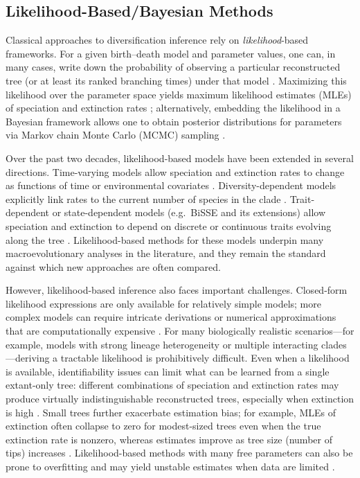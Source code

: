 \subsection{Likelihood-Based/Bayesian Methods}
Classical approaches to diversification inference rely on \emph{likelihood}-based frameworks. For a given birth--death model and parameter values, one can, in many cases, write down the probability of observing a particular reconstructed tree (or at least its ranked branching times) under that model \citep{nee_extinction_1994,nee_reconstructed_1994,stadler_simulating_2011,stadler_decoding_2024}. Maximizing this likelihood over the parameter space yields maximum likelihood estimates (MLEs) of speciation and extinction rates \citep{morlon_phylogenetic_2014,etienne_how_2016}; alternatively, embedding the likelihood in a Bayesian framework allows one to obtain posterior distributions for parameters via Markov chain Monte Carlo (MCMC) sampling \citep{xie_identifying_2023}. 

Over the past two decades, likelihood-based models have been extended in several directions. Time-varying models allow speciation and extinction rates to change as functions of time or environmental covariates \citep{morlon_reconciling_2011,stadler_inferring_2011}. Diversity-dependent models explicitly link rates to the current number of species in the clade \citep{etienne_diversity-dependence_2012,etienne_estimating_2014,valente_equilibrium_2015}. Trait-dependent or state-dependent models (e.g.\ BiSSE and its extensions) allow speciation and extinction to depend on discrete or continuous traits evolving along the tree \citep{maddison_estimating_2007,fitzjohn_diversitree_2012,alexander_quantifying_2016}. Likelihood-based methods for these models underpin many macroevolutionary analyses in the literature, and they remain the standard against which new approaches are often compared.

However, likelihood-based inference also faces important challenges. Closed-form likelihood expressions are only available for relatively simple models; more complex models can require intricate derivations or numerical approximations that are computationally expensive \citep{janzen_approximate_2015,lambert_deep_2023}. For many biologically realistic scenarios---for example, models with strong lineage heterogeneity or multiple interacting clades---deriving a tractable likelihood is prohibitively difficult. Even when a likelihood is available, identifiability issues can limit what can be learned from a single extant-only tree: different combinations of speciation and extinction rates may produce virtually indistinguishable reconstructed trees, especially when extinction is high \citep{rabosky_extinction_2010,louca_why_2021}. Small trees further exacerbate estimation bias; for example, MLEs of extinction often collapse to zero for modest-sized trees even when the true extinction rate is nonzero, whereas estimates improve as tree size (number of tips) increases \citep{etienne_how_2016}. Likelihood-based methods with many free parameters can also be prone to overfitting and may yield unstable estimates when data are limited \citep{ward_review_2008}.

